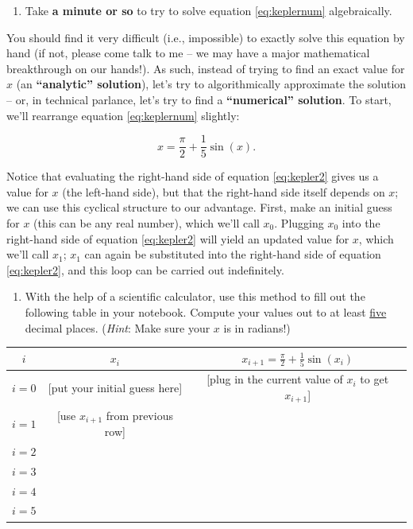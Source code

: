 \documentclass[11pt]{article}
\begin{document}
\begin{enumerate}
    \item Take \textbf{a minute or so} to try to solve equation \ref{eq:keplernum} algebraically.
\end{enumerate}

\noindent
You should find it very difficult (i.e., impossible) to exactly solve this equation by hand (if not, please come talk to me -- we may have a major mathematical breakthrough on our hands!). As such, instead of trying to find an exact value for $x$ (an \textbf{``analytic'' solution}), let's try to algorithmically approximate the solution -- or, in technical parlance, let's try to find a \textbf{``numerical'' solution}. To start, we'll rearrange equation \ref{eq:keplernum} slightly:

\begin{equation} \label{eq:kepler2}
    x = \frac{\pi}{2} + \frac{1}{5}\sin(x).
\end{equation}

\noindent
Notice that evaluating the right-hand side of equation \ref{eq:kepler2} gives us a value for $x$ (the left-hand side), but that the right-hand side itself depends on $x$; we can use this cyclical structure to our advantage. First, make an initial guess for $x$ (this can be any real number), which we'll call $x_0$. Plugging $x_0$ into the right-hand side of equation \ref{eq:kepler2} will yield an updated value for $x$, which we'll call $x_1$; $x_1$ can again be substituted into the right-hand side of equation \ref{eq:kepler2}, and this loop can be carried out indefinitely.

\begin{enumerate}[resume]
    \item With the help of a scientific calculator, use this method to fill out the following table in your notebook. Compute your values out to at least \underline{five} decimal places. (\textit{Hint}: Make sure your $x$ is in radians!)
\end{enumerate}


\vspace{10 pt}
\begin{tabular}{c|c|c}
		$i$ & $x_i$ & $x_{i+1} = \frac{\pi}{2} + \frac{1}{5}\sin(x_i)$ \\
\hline
\hline
$i = 0$ & [put your initial guess here] & [plug in the current value of $x_i$ to get $x_{i+1}$]\\
\hline
$i = 1$ & [use $x_{i+1}$ from previous row] & \\
\hline
$i = 2$ & & \\
\hline
$i = 3$ & & \\
\hline
$i = 4$ & & \\
\hline
$i = 5$ & & \\
\end{tabular}
\end{document}
